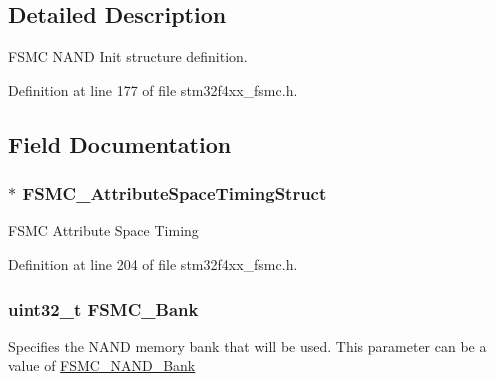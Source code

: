 \subsection{Detailed Description}
F\-S\-M\-C N\-A\-N\-D Init structure definition. 

Definition at line 177 of file stm32f4xx\-\_\-fsmc.\-h.



\subsection{Field Documentation}
\hypertarget{struct_f_s_m_c___n_a_n_d_init_type_def_a96d5a1d02a42f194b9d5ebaae46dd3d7}{
\subsubsection[{F\-S\-M\-C\-\_\-\-Attribute\-Space\-Timing\-Struct}]{$\ast$ F\-S\-M\-C\-\_\-\-Attribute\-Space\-Timing\-Struct}}\label{struct_f_s_m_c___n_a_n_d_init_type_def_a96d5a1d02a42f194b9d5ebaae46dd3d7}
F\-S\-M\-C Attribute Space Timing 

Definition at line 204 of file stm32f4xx\-\_\-fsmc.\-h.

\hypertarget{struct_f_s_m_c___n_a_n_d_init_type_def_a787e4c845195c81c7326893451a2fc6f}{
\subsubsection[{F\-S\-M\-C\-\_\-\-Bank}]{\setlength{\rightskip}{0pt plus 5cm}uint32\-\_\-t F\-S\-M\-C\-\_\-\-Bank}}\label{struct_f_s_m_c___n_a_n_d_init_type_def_a787e4c845195c81c7326893451a2fc6f}
Specifies the N\-A\-N\-D memory bank that will be used. This parameter can be a value of \hyperlink{group___f_s_m_c___n_a_n_d___bank}{F\-S\-M\-C\-\_\-\-N\-A\-N\-D\-\_\-\-Bank} 


